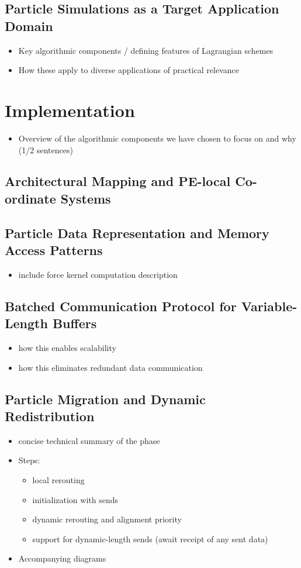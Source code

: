 \documentclass[review, anonymous, acmsmall]{acmart}
\begin{document}
\subsection{Particle Simulations as a Target Application Domain}
\begin{itemize}
  \item Key algorithmic components / defining features of Lagrangian schemes
  \item How these apply to diverse applications of practical relevance
\end{itemize}

\section{Implementation}
\begin{itemize}
  \item Overview of the algorithmic components we have chosen to focus on and why (1/2 sentences) 
\end{itemize}
\subsection{Architectural Mapping and PE-local Co-ordinate Systems}
\subsection{Particle Data Representation and Memory Access Patterns}
\begin{itemize}
  \item include force kernel computation description
\end{itemize}
\subsection{Batched Communication Protocol for Variable-Length Buffers}
\begin{itemize}
  \item how this enables scalability
  \item how this eliminates redundant data communication
\end{itemize}
\subsection{Particle Migration and Dynamic Redistribution}
\begin{itemize}
  \item concise technical summary of the phase
  \item Steps:
  \begin{itemize}
    \item local rerouting
    \item initialization with sends
    \item dynamic rerouting and alignment priority
    \item support for dynamic-length sends (await receipt of any sent data)
  \end{itemize}
  \item Accompanying diagrams
\end{itemize}
\end{document}
